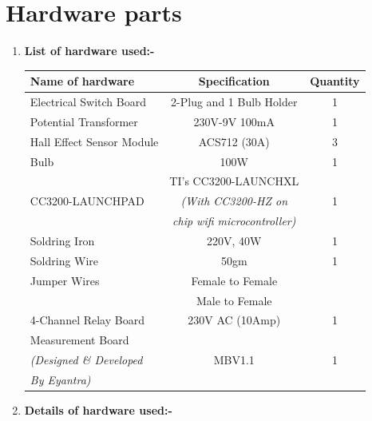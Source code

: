 \documentclass[a4paper,12pt,oneside]{book}
\begin{document}
\section{Hardware parts}
\begin{enumerate}
  \item \textbf{List of hardware used:-}\\
  
		 \begin{tabular}{|l|c|c|}
		 	\hline
		 	\textbf{Name of hardware} & \textbf{Specification} & \textbf{Quantity} \\ \hline
		 	Electrical Switch Board& 2-Plug and 1 Bulb Holder & 1\\ \hline
		 	Potential Transformer& 230V-9V 100mA &1 \\ \hline
		 	Hall Effect Sensor Module& ACS712 (30A) &3\\ \hline
		 	Bulb& 100W & 1\\ \hline
		 	& TI's CC3200-LAUNCHXL&\\
		 	CC3200-LAUNCHPAD&\textit{(With CC3200-HZ on } &1 \\
		 	&\textit{ chip wifi microcontroller)} &\\\hline
		 	Soldring Iron& 220V, 40W &1 \\ \hline
		 	Soldring Wire& 50gm & 1 \\ \hline
		 	Jumper Wires& Female to Female & \\\cline{2-3}
		 	&Male to Female& \\\hline
		 	4-Channel Relay Board& 230V AC (10Amp)& 1\\ \hline
		 	Measurement Board& & \\ 
		 	\textit{(Designed \& Developed } & MBV1.1 & 1 \\
		 	\textit{ \hspace{1cm}By Eyantra) } & & \\ \hline
		 \end{tabular}
		 \vspace{1cm}
	\item \textbf{Details of hardware used:-}
\end{enumerate}
\end{document}
